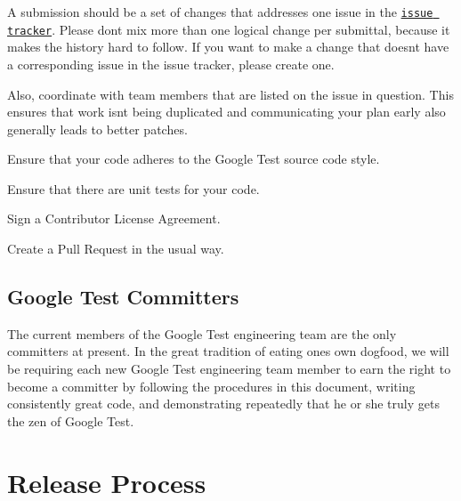 \begin{DoxyEnumerate}
\item A submission should be a set of changes that addresses one issue in the \href{https://github.com/google/googletest/issues}{\tt issue tracker}. Please don\textquotesingle{}t mix more than one logical change per submittal, because it makes the history hard to follow. If you want to make a change that doesn\textquotesingle{}t have a corresponding issue in the issue tracker, please create one.
\end{DoxyEnumerate}
\begin{DoxyEnumerate}
\item Also, coordinate with team members that are listed on the issue in question. This ensures that work isn\textquotesingle{}t being duplicated and communicating your plan early also generally leads to better patches.
\end{DoxyEnumerate}
\begin{DoxyEnumerate}
\item Ensure that your code adheres to the Google Test source code style.
\end{DoxyEnumerate}
\begin{DoxyEnumerate}
\item Ensure that there are unit tests for your code.
\end{DoxyEnumerate}
\begin{DoxyEnumerate}
\item Sign a Contributor License Agreement.
\end{DoxyEnumerate}
\begin{DoxyEnumerate}
\item Create a Pull Request in the usual way.
\end{DoxyEnumerate}

\subsection*{Google Test Committers}

The current members of the Google Test engineering team are the only committers at present. In the great tradition of eating one\textquotesingle{}s own dogfood, we will be requiring each new Google Test engineering team member to earn the right to become a committer by following the procedures in this document, writing consistently great code, and demonstrating repeatedly that he or she truly gets the zen of Google Test.

\section*{Release Process}

